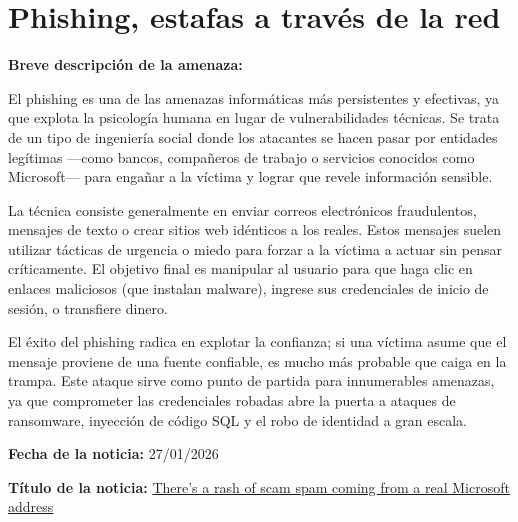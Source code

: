 \chapter{Phishing, estafas a través de la red}
\begin{tcolorbox}[
    title=Detalles de la Noticia, 
    colframe=black, %
    colback=gray!5,         %
    sharp corners,          %
    breakable              %
]

    \textbf{Breve descripción de la amenaza:}
    \vspace{0.5em}
    
    El phishing es una de las amenazas informáticas más persistentes y efectivas, ya que explota la psicología humana en lugar de vulnerabilidades técnicas. Se trata de un tipo de ingeniería social donde los atacantes se hacen pasar por entidades legítimas —como bancos, compañeros de trabajo o servicios conocidos como Microsoft— para engañar a la víctima y lograr que revele información sensible.

La técnica consiste generalmente en enviar correos electrónicos fraudulentos, mensajes de texto o crear sitios web idénticos a los reales. Estos mensajes suelen utilizar tácticas de urgencia o miedo para forzar a la víctima a actuar sin pensar críticamente. El objetivo final es manipular al usuario para que haga clic en enlaces maliciosos (que instalan malware), ingrese sus credenciales de inicio de sesión, o transfiere dinero.

El éxito del phishing radica en explotar la confianza; si una víctima asume que el mensaje proviene de una fuente confiable, es mucho más probable que caiga en la trampa. Este ataque sirve como punto de partida para innumerables amenazas, ya que comprometer las credenciales robadas abre la puerta a ataques de ransomware, inyección de código SQL y el robo de identidad a gran escala.

   
    \vspace{0.5em}

    \textbf{Fecha de la noticia:}
    \vspace{0.5em}
    27/01/2026

    \textbf{Título de la noticia:}
    \vspace{0.5em}
    \href{https://arstechnica.com/information-technology/2026/01/theres-a-rash-of-scam-spam-coming-from-a-real-microsoft-address/}{There’s a rash of scam spam coming from a real Microsoft address}


\end{tcolorbox}
